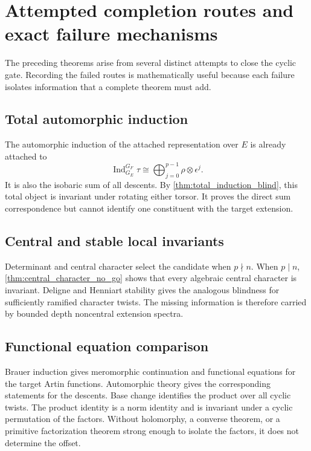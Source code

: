 \documentclass{aomart}
\theoremstyle{definition}
\theoremstyle{remark}
\newcommand{\Ind}{\operatorname{Ind}}
\begin{document}
\section{Attempted completion routes and exact failure mechanisms}\label{sec:attempted_routes}

The preceding theorems arise from several distinct attempts to close the cyclic gate. Recording the failed routes is mathematically useful because each failure isolates information that a complete theorem must add.

\subsection{Total automorphic induction}

The automorphic induction of the attached representation over \(E\) is already attached to
\[
 \Ind_{G_E}^{G_F}\tau
 \cong
 \bigoplus_{j=0}^{p-1}
 \rho\otimes\epsilon^j.
\]
It is also the isobaric sum of all descents. By \cref{thm:total_induction_blind}, this total object is invariant under rotating either torsor. It proves the direct sum correspondence but cannot identify one constituent with the target extension.

\subsection{Central and stable local invariants}

Determinant and central character select the candidate when \(p\nmid n\). When \(p\mid n\), \cref{thm:central_character_no_go} shows that every algebraic central character is invariant. Deligne and Henniart stability gives the analogous blindness for sufficiently ramified character twists. The missing information is therefore carried by bounded depth noncentral extension spectra.

\subsection{Functional equation comparison}

Brauer induction gives meromorphic continuation and functional equations for the target Artin functions. Automorphic theory gives the corresponding statements for the descents. Base change identifies the product over all cyclic twists. The product identity is a norm identity and is invariant under a cyclic permutation of the factors. Without holomorphy, a converse theorem, or a primitive factorization theorem strong enough to isolate the factors, it does not determine the offset.
\end{document}
